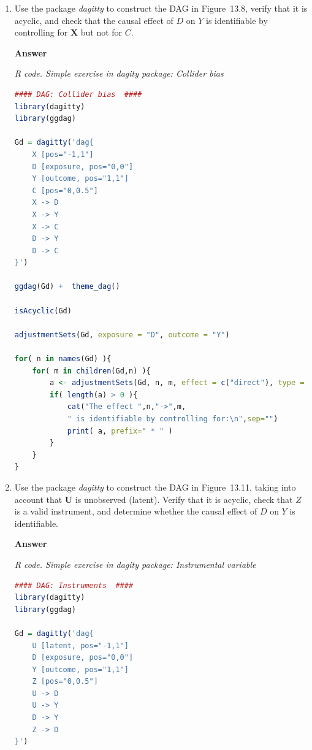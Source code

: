 \begin{enumerate}[leftmargin=*]
\item Use the package \textit{dagitty} to construct the DAG in Figure~13.8, verify that it is acyclic, and check that the causal effect of \(D\) on \(Y\) is identifiable by controlling for \(\mathbf{X}\) but not for \(C\).


\textbf{Answer}

\begin{tcolorbox}[enhanced,width=4.67in,center upper,
	fontupper=\large\bfseries,drop shadow southwest,sharp corners]
	\textit{R code. Simple exercise in \textit{dagity} package: Collider bias}
	\begin{VF}
		\begin{lstlisting}[language=R]		
#### DAG: Collider bias  ####
library(dagitty)
library(ggdag)

Gd = dagitty('dag{
	X [pos="-1,1"]
	D [exposure, pos="0,0"]
	Y [outcome, pos="1,1"]
	C [pos="0,0.5"]
	X -> D
	X -> Y
	X -> C
	D -> Y
	D -> C
}')

ggdag(Gd) +  theme_dag()

isAcyclic(Gd)

adjustmentSets(Gd, exposure = "D", outcome = "Y")

for( n in names(Gd) ){
	for( m in children(Gd,n) ){
		a <- adjustmentSets(Gd, n, m, effect = c("direct"), type = c("minimal"))
		if( length(a) > 0 ){
			cat("The effect ",n,"->",m,
			" is identifiable by controlling for:\n",sep="")
			print( a, prefix=" * " )
		}
	}
}
\end{lstlisting}
	\end{VF}
\end{tcolorbox}

\item Use the package \textit{dagitty} to construct the DAG in Figure~13.11, taking into account that $\mathbf{U}$ is unobserved (latent). Verify that it is acyclic, check that $Z$ is a valid instrument, and determine whether the causal effect of \(D\) on \(Y\) is identifiable.

\textbf{Answer}

\begin{tcolorbox}[enhanced,width=4.67in,center upper,
	fontupper=\large\bfseries,drop shadow southwest,sharp corners]
	\textit{R code. Simple exercise in \textit{dagity} package: Instrumental variable}
	\begin{VF}
		\begin{lstlisting}[language=R]		
#### DAG: Instruments  ####
library(dagitty)
library(ggdag)

Gd = dagitty('dag{
	U [latent, pos="-1,1"]
	D [exposure, pos="0,0"]
	Y [outcome, pos="1,1"]
	Z [pos="0,0.5"]
	U -> D
	U -> Y
	D -> Y
	Z -> D
}')


\end{lstlisting}
\end{VF}
\end{tcolorbox}
\end{enumerate}
